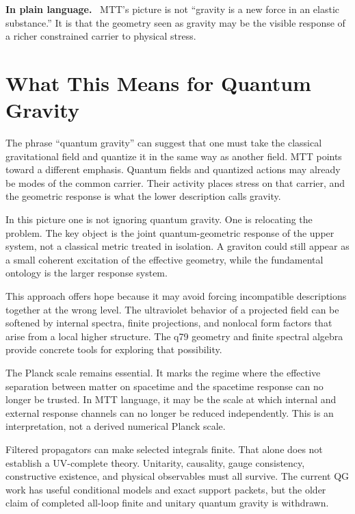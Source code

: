 \documentclass[11pt,openany]{book}
\newenvironment{plainsummary}
  {\par\small\noindent\textbf{In plain language.}\ }
  {\par}
\begin{document}
\begin{plainsummary}
MTT's picture is not ``gravity is a new force in an elastic substance.''
It is that the geometry seen as gravity may be the visible response of a
richer constrained carrier to physical stress.
\end{plainsummary}

\chapter{What This Means for Quantum Gravity}

The phrase ``quantum gravity'' can suggest that one must take the classical
gravitational field and quantize it in the same way as another field. MTT
points toward a different emphasis. Quantum fields and quantized actions may
already be modes of the common carrier. Their activity places stress on that
carrier, and the geometric response is what the lower description calls
gravity.

In this picture one is not ignoring quantum gravity. One is relocating the
problem. The key object is the joint quantum-geometric response of the upper
system, not a classical metric treated in isolation. A graviton could still
appear as a small coherent excitation of the effective geometry, while the
fundamental ontology is the larger response system.

This approach offers hope because it may avoid forcing incompatible
descriptions together at the wrong level. The ultraviolet behavior of a
projected field can be softened by internal spectra, finite projections, and
nonlocal form factors that arise from a local higher structure. The q79
geometry and finite spectral algebra provide concrete tools for exploring
that possibility.

The Planck scale remains essential. It marks the regime where the effective
separation between matter on spacetime and the spacetime response can no
longer be trusted. In MTT language, it may be the scale at which internal and
external response channels can no longer be reduced independently. This is
an interpretation, not a derived numerical Planck scale.

Filtered propagators can make selected integrals finite. That alone does not
establish a UV-complete theory. Unitarity, causality, gauge consistency,
constructive existence, and physical observables must all survive. The
current QG work has useful conditional models and exact support packets, but
the older claim of completed all-loop finite and unitary quantum gravity is
withdrawn.
\end{document}
